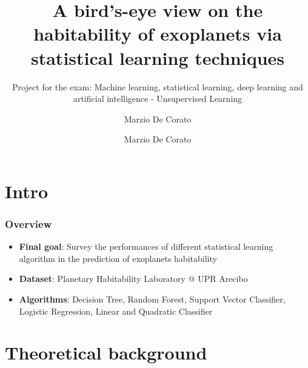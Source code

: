 \documentclass[compress]{beamer}
\author{Marzio De Corato}
\title[Exoplanets survey via SL techniques]{A bird’s-eye view on the habitability of exoplanets via statistical learning techniques}
\author{Marzio De Corato}
\subtitle{Project for the exam: Machine learning, statistical
learning, deep learning and artificial intelligence - Unsupervised Learning}
\begin{document}
\frame{\titlepage}

\section{Intro}

\begin{frame}
\frametitle{Overview}
\begin{itemize}
\item\textbf{Final goal}: Survey the performances of different statistical learning algorithm in the prediction of exoplanets habitability
\item\textbf{Dataset}: Planetary Habitability Laboratory @ UPR Arecibo \cite{planet_dataset}
\item\textbf{Algorithms}: Decision Tree, Random Forest, Support Vector Classifier, Logistic Regression, Linear and Quadratic Classifier
\end{itemize}
\end{frame}

\section{Theoretical background}
\end{document}
